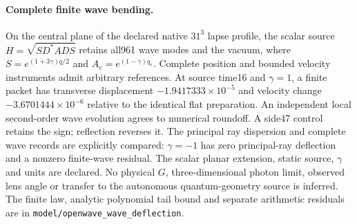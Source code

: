 \paragraph{Complete finite wave bending.}
On the central plane of the declared native $31^3$ lapse profile, the
scalar source $H=\sqrt{SD^*ADS}$ retains all961 wave modes and the vacuum,
where $S=e^{(1+3\gamma)q/2}$ and $A_e=e^{(1-\gamma)q_e}$.
Complete position and bounded velocity instruments admit arbitrary
references. At source time16 and $\gamma=1$, a finite packet has
transverse displacement $-1.9417333\times10^{-5}$ and velocity change
$-3.6701444\times10^{-6}$ relative to the identical flat preparation.
An independent local second-order wave evolution agrees to numerical
roundoff. A side47 control retains the sign; reflection reverses it.
The principal ray dispersion and complete wave records are explicitly
compared: $\gamma=-1$ has zero principal-ray deflection and a nonzero
finite-wave residual. The scalar planar extension, static source,
$\gamma$ and units are declared. No physical $G$, three-dimensional
photon limit, observed lens angle or transfer to the autonomous
quantum-geometry source is inferred. The finite law, analytic polynomial
tail bound and separate arithmetic residuals are in
\texttt{model/openwave\_wave\_deflection}.
